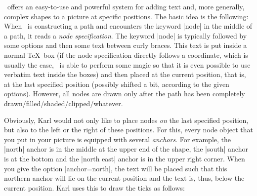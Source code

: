 \tikzname\ offers an easy-to-use and powerful system for adding text and, more
generally, complex shapes to a picture at specific positions. The basic idea is
the following: When \tikzname\ is constructing a path and encounters the
keyword |node| in the middle of a path, it reads a \emph{node specification}.
The keyword |node| is typically followed by some options and then some text
between curly braces. This text is put inside a normal \TeX\ box (if the node
specification directly follows a coordinate, which is usually the case,
\tikzname\ is able to perform some magic so that it is even possible to use
verbatim text inside the boxes) and then placed at the current position, that
is, at the last specified position (possibly shifted a bit, according to the
given options). However, all nodes are drawn only after the path has been
completely drawn/filled/shaded/clipped/whatever.
%
\begin{codeexample}[]
\end{codeexample}

Obviously, Karl would not only like to place nodes \emph{on} the last specified
position, but also to the left or the right of these positions. For this, every
node object that you put in your picture is equipped with several
\emph{anchors}. For example, the |north| anchor is in the middle at the upper
end of the shape, the |south| anchor is at the bottom and the |north east|
anchor is in the upper right corner. When you give the option |anchor=north|,
the text will be placed such that this northern anchor will lie on the current
position and the text is, thus, below the current position. Karl uses this to
draw the ticks as follows:
%
\begin{codeexample}[]
\end{codeexample}

